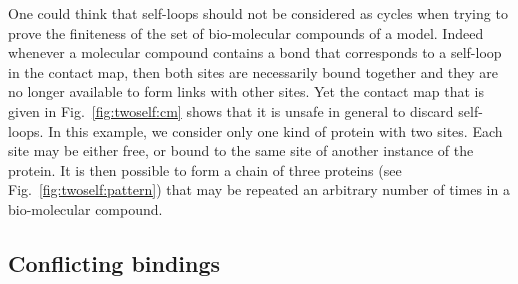 \documentclass{entcs}
\begin{document}
One could think that self-loops should not be considered as cycles when trying to prove the finiteness of the set of bio-molecular compounds of a model. Indeed whenever a molecular compound contains a bond that corresponds to a self-loop in the contact map, then both sites are necessarily  bound together and they are no longer available to form links with other sites. Yet the contact map that is given in Fig.~\ref{fig:twoself:cm} shows that it is unsafe in general to discard self-loops. In this example, we consider only one kind of protein with two sites. Each site may be either free, or bound to the same site of another instance of the protein. It is then possible to form a chain of three proteins (see Fig.~\ref{fig:twoself:pattern}) that may be repeated an arbitrary number of times in a bio-molecular compound.

\subsection{Conflicting bindings}
\label{sec:conflict}
\end{document}
